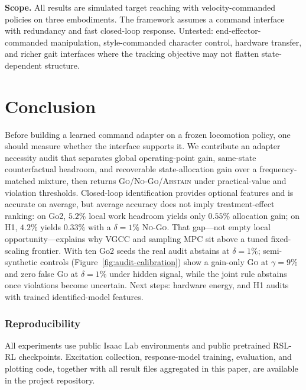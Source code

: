 \documentclass{article}
\begin{document}
\textbf{Scope.}
All results are simulated target reaching with velocity-commanded policies on
three embodiments. The framework assumes a command interface with redundancy and
fast closed-loop response. Untested: end-effector-commanded manipulation,
style-commanded character control, hardware transfer, and richer gait interfaces
where the tracking objective may not flatten state-dependent structure.

\section{Conclusion}
\label{sec:conclusion}

Before building a learned command adapter on a frozen locomotion policy, one
should measure whether the interface supports it. We contribute an adapter
necessity audit that separates global operating-point gain, same-state
counterfactual headroom, and recoverable state-allocation gain over a
frequency-matched mixture, then returns \textsc{Go}/\textsc{No-Go}/\textsc{Abstain}
under practical-value and violation thresholds. Closed-loop identification
provides optional features and is accurate on average, but average accuracy does
not imply treatment-effect ranking: on Go2, $5.2\%$ local work headroom
yields only $0.55\%$ allocation gain; on H1, $4.2\%$ yields $0.33\%$ with a
$\delta=1\%$ \textsc{No-Go}. That gap---not empty local
opportunity---explains why VGCC and sampling MPC sit above a tuned fixed-scaling
frontier. With ten Go2 seeds the real audit abstains at $\delta=1\%$;
semi-synthetic controls (Figure~\ref{fig:audit-calibration}) show a gain-only
\textsc{Go} at $\gamma=9\%$ and zero false \textsc{Go} at $\delta=1\%$ under
hidden signal, while the joint rule abstains once violations become uncertain.
Next steps: hardware energy, and H1 audits with trained identified-model features.

\subsubsection*{Reproducibility}
All experiments use public Isaac Lab environments and public pretrained RSL-RL
checkpoints. Excitation collection, response-model training, evaluation, and
plotting code, together with all result files aggregated in this paper, are
available in the project repository.




\clearpage
\appendix

\end{document}
